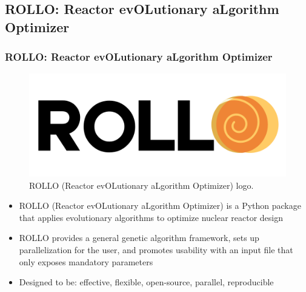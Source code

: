 \subsection{ROLLO: Reactor evOLutionary aLgorithm Optimizer}
\begin{frame}
    \frametitle{ROLLO: Reactor evOLutionary aLgorithm Optimizer}
    \begin{figure}
        \includegraphics[width=0.7\linewidth]{figures/rollo-logo.png} 
        \caption{ROLLO (Reactor evOLutionary aLgorithm Optimizer) logo.}
    \end{figure}
    \begin{itemize}
        \item ROLLO (Reactor evOLutionary aLgorithm Optimizer) is a Python package 
        that applies evolutionary algorithms to optimize nuclear reactor design
        \item ROLLO provides a general genetic algorithm framework, sets up 
        parallelization for the user, and promotes usability with an input file that
        only exposes mandatory parameters
        \item Designed to be: effective, flexible, open-source, parallel, reproducible
    \end{itemize}
\end{frame}

